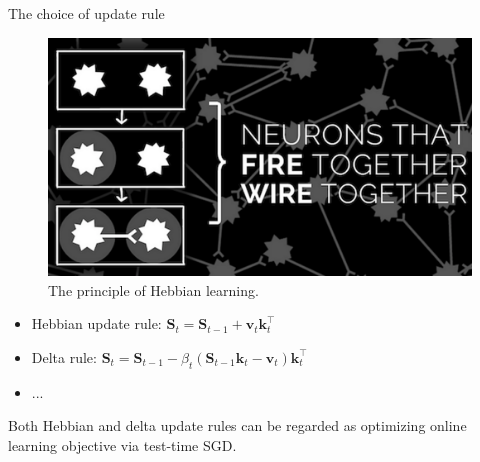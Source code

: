 \begin{frame}{The choice of update rule}
    \begin{figure}
        \centering
        \includegraphics[width=.5\linewidth]{figure/hebbian.png}
        \caption{The principle of Hebbian learning.}
    \end{figure}
    \begin{itemize}
        \item Hebbian update rule: $\mathbf{S}_t = \mathbf{S}_{t-1} + \mathbf{v}_t \mathbf{k}_t^\top$
        \item Delta rule: $\mathbf{S}_t = \mathbf{S}_{t-1} - \beta_t \left(\mathbf{S}_{t-1} \mathbf{k}_t - \mathbf{v}_t\right) \mathbf{k}_t^\top$
        \item ...
    \end{itemize}
    Both Hebbian and delta update rules can be regarded as optimizing online learning objective via {\color{red}test-time SGD}.


\end{frame}
